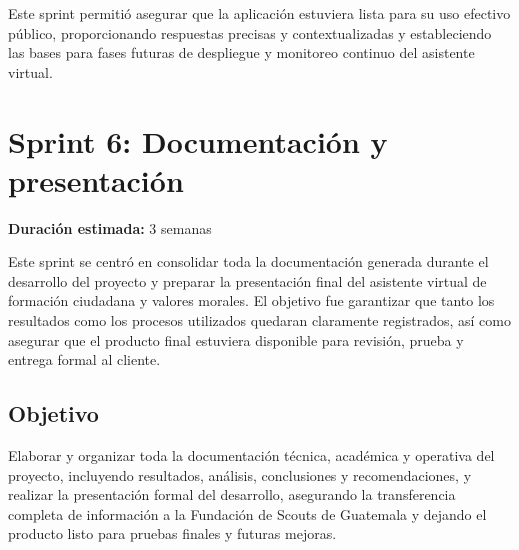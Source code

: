 Este sprint permitió asegurar que la aplicación estuviera lista para su uso
efectivo público, proporcionando respuestas precisas y contextualizadas y
estableciendo las bases para fases futuras de despliegue y monitoreo continuo
del asistente virtual.

\section{Sprint 6: Documentación y presentación}
\textbf{Duración estimada:} 3 semanas

Este sprint se centró en consolidar toda la documentación generada durante el
desarrollo del proyecto y preparar la presentación final del asistente virtual
de formación ciudadana y valores morales. El objetivo fue garantizar que tanto
los resultados como los procesos utilizados quedaran claramente registrados,
así como asegurar que el producto final estuviera disponible para revisión,
prueba y entrega formal al cliente.

\subsection{Objetivo}
Elaborar y organizar toda la documentación técnica, académica y operativa del
proyecto, incluyendo resultados, análisis, conclusiones y recomendaciones, y
realizar la presentación formal del desarrollo, asegurando la transferencia
completa de información a la Fundación de Scouts de Guatemala y dejando el
producto listo para pruebas finales y futuras mejoras.

